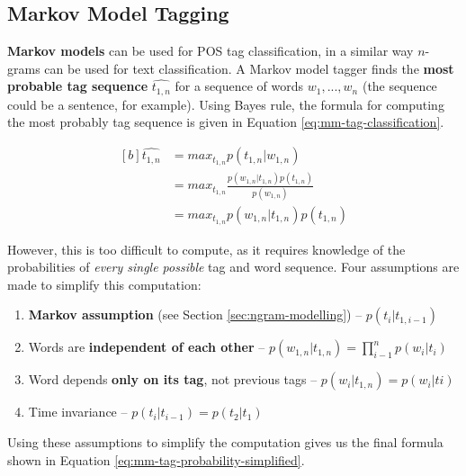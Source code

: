 \documentclass{article}
\begin{document}
\subsection{Markov Model Tagging}

\textbf{Markov models} can be used for POS tag classification, in a similar way $n$-grams can be used for text classification. A Markov model tagger finds the \textbf{most probable tag sequence} $\hat{t_{1,n}}$ for a sequence of words $w_1,...,w_n$ (the sequence could be a sentence, for example). Using Bayes rule, the formula for computing the most probably tag sequence is given in Equation \ref{eq:mm-tag-classification}.

\begin{equation}
\begin{aligned}[b]
	\hat{t_{1,n}} &= max_{t_{1,n}} p(t_{1,n}|w_{1,n}) \\
	&= max_{t_{1,n}} \frac{p(w_{1,n}|t_{1,n})p(t_{1,n})}{p(w_{1,n})} \\
	&= max_{t_{1,n}} p(w_{1,n}|t_{1,n})p(t_{1,n})
\end{aligned}
\label{eq:mm-tag-classification}
\end{equation}

However, this is too difficult to compute, as it requires knowledge of the probabilities of \textit{every single possible} tag and word sequence. Four assumptions are made to simplify this computation:
\begin{enumerate}
	\item \textbf{Markov assumption} (see Section \ref{sec:ngram-modelling}) -- $p(t_i|t_{1,i-1})$
	\item Words are \textbf{independent of each other} --
	$p(w_{1,n}|t_{1,n}) = \prod_{i-1}^n { p(w_i|t_i) }$
	\item Word depends \textbf{only on its tag}, not previous tags -- $p(w_i|t_{1,n}) = p(w_i|ti)$
	\item Time invariance -- $p(t_i|t_{i-1}) = p(t_2|t_1)$
\end{enumerate}

Using these assumptions to simplify the computation gives us the final formula shown in Equation \ref{eq:mm-tag-probability-simplified}. 
\end{document}
